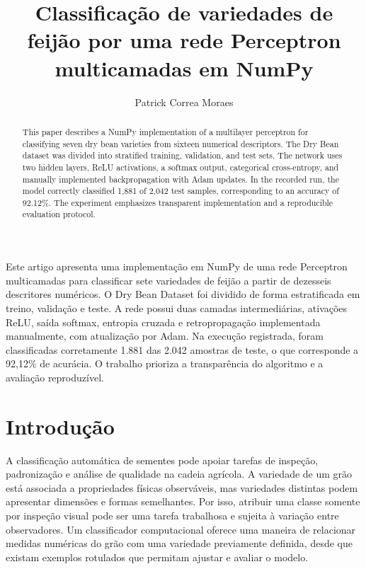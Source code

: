 \documentclass[12pt]{article}
\title{Classificação de variedades de feijão por uma rede Perceptron multicamadas em NumPy}
\author{
  Patrick Correa Moraes\inst{1}
}
\begin{document}
\maketitle

\begin{abstract}
This paper describes a NumPy implementation of a multilayer perceptron for classifying seven dry bean varieties from sixteen numerical descriptors. The Dry Bean dataset was divided into stratified training, validation, and test sets. The network uses two hidden layers, ReLU activations, a softmax output, categorical cross-entropy, and manually implemented backpropagation with Adam updates. In the recorded run, the model correctly classified 1,881 of 2,042 test samples, corresponding to an accuracy of 92.12\%. The experiment emphasizes transparent implementation and a reproducible evaluation protocol.
\end{abstract}

\begin{resumo}
Este artigo apresenta uma implementação em NumPy de uma rede Perceptron multicamadas para classificar sete variedades de feijão a partir de dezesseis descritores numéricos. O Dry Bean Dataset foi dividido de forma estratificada em treino, validação e teste. A rede possui duas camadas intermediárias, ativações ReLU, saída softmax, entropia cruzada e retropropagação implementada manualmente, com atualização por Adam. Na execução registrada, foram classificadas corretamente 1.881 das 2.042 amostras de teste, o que corresponde a 92,12\% de acurácia. O trabalho prioriza a transparência do algoritmo e a avaliação reproduzível.
\end{resumo}

\section{Introdução}

A classificação automática de sementes pode apoiar tarefas de inspeção, padronização e análise de qualidade na cadeia agrícola. A variedade de um grão está associada a propriedades físicas observáveis, mas variedades distintas podem apresentar dimensões e formas semelhantes. Por isso, atribuir uma classe somente por inspeção visual pode ser uma tarefa trabalhosa e sujeita à variação entre observadores. Um classificador computacional oferece uma maneira de relacionar medidas numéricas do grão com uma variedade previamente definida, desde que existam exemplos rotulados que permitam ajustar e avaliar o modelo.
\end{document}

